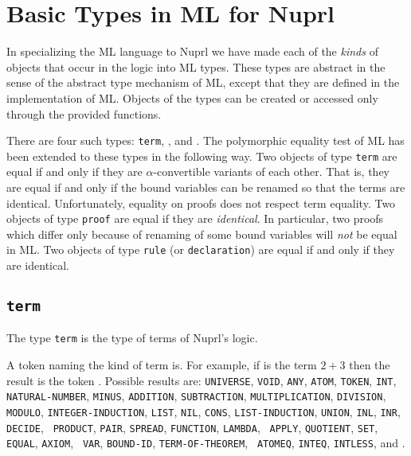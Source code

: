 \section{Basic Types in ML for Nuprl}

In specializing the ML language to Nuprl
we have made each of the {\em kinds} of
objects that occur in the logic into ML types.   These types are abstract
in the sense of the abstract type mechanism of ML, except that they are
defined in the implementation of ML.  Objects of the types can be created
or accessed only through the provided functions.  

There are four such types: {\tt term}, ,  and
.  The polymorphic equality test \tid{=} of ML has been extended
to these types in the following way.  Two objects of type {\tt term} are
equal if and only if they are $\alpha$-convertible variants of each other.
That is, they are equal if and only if the bound variables can be renamed
so that the terms are identical.  Unfortunately, equality on proofs does
not respect term equality.  Two objects of type {\tt proof} are equal if
they are {\em identical}.  In particular, two proofs which differ only
because of renaming of some bound variables will {\em not} be equal in ML.
Two objects of type {\tt rule} (or {\tt declaration}) are equal if and only
if they are identical.

\subsection*{\tt term}

The type {\tt term} is the type of terms of Nuprl's logic.

   A token naming the kind of term
 is.  For example, if  is the term $2+3$ then the result is
the token .  Possible results are: {\tt UNIVERSE},
{\tt VOID}, {\tt ANY}, {\tt ATOM}, {\tt TOKEN}, {\tt INT}, {\tt
NATURAL-NUMBER}, {\tt MINUS}, {\tt ADDITION}, {\tt SUBTRACTION},
{\tt MULTIPLICATION}, {\tt DIVISION}, {\tt MODULO}, 
{\tt INTEGER-INDUCTION}, {\tt LIST}, {\tt NIL}, {\tt CONS}, 
{\tt LIST-INDUCTION}, {\tt UNION}, {\tt INL}, {\tt INR}, {\tt DECIDE}, {\tt
PRODUCT}, {\tt PAIR}, {\tt SPREAD}, {\tt FUNCTION}, {\tt LAMBDA}, {\tt
APPLY}, {\tt QUOTIENT}, {\tt SET}, {\tt EQUAL}, {\tt AXIOM}, {\tt
VAR}, {\tt BOUND-ID}, {\tt TERM-OF-THEOREM}, {\tt
ATOMEQ}, {\tt INTEQ}, {\tt INTLESS}, and .

\smallskip

